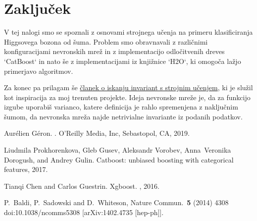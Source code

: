 \documentclass{article}
\begin{document}
\section{Zaključek}
V tej nalogi smo se spoznali z osnovami strojnega učenja na primeru klasificiranja Higgsovega bozona od šuma. Problem smo obravnavali z različnimi konfiguracijami nevronskih mrež in z implementacijo odločitvenih dreves `CatBoost` in nato še z implementacijami iz knjižnice `H2O`, ki omogoča lažjo primerjavo algoritmov.

Za konec pa prilagam še \href{https://journals.aps.org/prresearch/pdf/10.1103/PhysRevResearch.3.L042035}{članek o iskanju invariant s strojnim učenjem}, ki je služil kot inspiracija za moj trenuten projekte. Ideja nevronske mreže je, da za funkcijo izgube uporabiš varianco, katere definicija je rahlo spremenjena z naključnim šumom, da nevronska mreža najde netrivialne invariante iz podanih podatkov.  


%

\begin{thebibliography}{1}
 
  
  Aur\'{e}lien G\'{e}ron.
  .
  \newblock O'Reilly Media, Inc, Sebastopol, CA, 2019.
  
  Liudmila Prokhorenkova, Gleb Gusev, Aleksandr Vorobev, Anna~Veronika Dorogush,
    and Andrey Gulin.
  \newblock Catboost: unbiased boosting with categorical features, 2017.

  Tianqi Chen and Carlos Guestrin.
  \newblock Xgboost.
  , 2016.

P.~Baldi, P.~Sadowski and D.~Whiteson,
Nature Commun.\  {\bf 5} (2014) 4308
doi:10.1038/ncomms5308
[arXiv:1402.4735 [hep-ph]].
\end{thebibliography}
\end{document}
